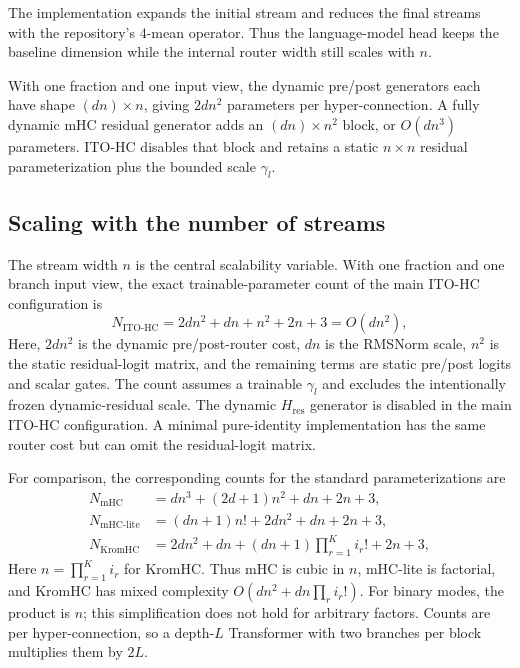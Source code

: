 \documentclass{article}
\begin{document}
The implementation expands the initial stream and reduces the final streams with the repository's $4$-mean operator. Thus the language-model head keeps the baseline dimension while the internal router width still scales with $n$.

With one fraction and one input view, the dynamic pre/post generators each have shape $(dn)\times n$, giving $2dn^2$ parameters per hyper-connection. A fully dynamic mHC residual generator adds an $(dn)\times n^2$ block, or $O(dn^3)$ parameters. ITO-HC disables that block and retains a static $n\times n$ residual parameterization plus the bounded scale $\gamma_l$.

\subsection{Scaling with the number of streams}
The stream width $n$ is the central scalability variable. With one fraction and one branch input view, the exact trainable-parameter count of the main ITO-HC configuration is
\begin{equation}
 N_{\mathrm{ITO\text{-}HC}}=2dn^2+dn+n^2+2n+3=O(dn^2),
 \label{eq:ito-param-count}
\end{equation}
Here, $2dn^2$ is the dynamic pre/post-router cost, $dn$ is the RMSNorm scale, $n^2$ is the static residual-logit matrix, and the remaining terms are static pre/post logits and scalar gates. The count assumes a trainable $\gamma_l$ and excludes the intentionally frozen dynamic-residual scale. The dynamic $H_{\mathrm{res}}$ generator is disabled in the main ITO-HC configuration. A minimal pure-identity implementation has the same router cost but can omit the residual-logit matrix.

For comparison, the corresponding counts for the standard parameterizations are
\begin{align}
 N_{\mathrm{mHC}} &= dn^3+(2d+1)n^2+dn+2n+3,\\
 N_{\mathrm{mHC\text{-}lite}} &= (dn+1)n!+2dn^2+dn+2n+3,\\
 N_{\mathrm{KromHC}} &= 2dn^2+dn+(dn+1)\prod_{r=1}^{K}i_r!+2n+3,
 \label{eq:prior-counts}
\end{align}
Here $n=\prod_{r=1}^{K}i_r$ for KromHC. Thus mHC is cubic in $n$, mHC-lite is factorial, and KromHC has mixed complexity $O(dn^2+dn\prod_r i_r!)$. For binary modes, the product is $n$; this simplification does not hold for arbitrary factors. Counts are per hyper-connection, so a depth-$L$ Transformer with two branches per block multiplies them by $2L$.
\end{document}
